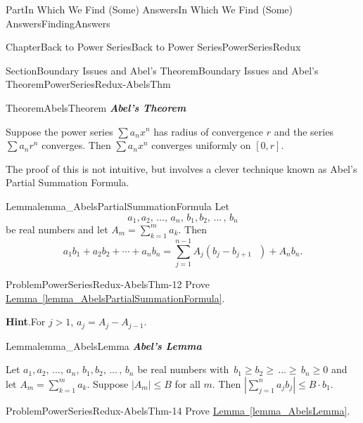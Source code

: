 \documentclass[oneside,10pt,]{book}
\newcommand{\blocktitlefont}{\relax}
\newcommand{\xreffont}{\relax}
\newcommand{\alert}[1]{\textbf{\textit{#1}}}
\numberwithin{equation}{part}
\newcommand{\eps}{\varepsilon}
\newcommand{\gt}{>}
\begin{document}
\begin{partptx}{Part}{In Which We Find (Some) Answers}{}{In Which We Find (Some) Answers}{}{}{FindingAnswers}
\begin{chapterptx}{Chapter}{Back to Power Series}{}{Back to Power Series}{}{}{PowerSeriesRedux}
\begin{sectionptx}{Section}{Boundary Issues and Abel's Theorem}{}{Boundary Issues and Abel's Theorem}{}{}{PowerSeriesRedux-AbelsThm}
\begin{theorem}{Theorem}{}{}{AbelsTheorem}%
\alert{Abel's Theorem}%
\par
{} Suppose the power series \(\sum a_nx^n\) has radius of convergence \(r\) and the series \(\sum a_nr^n\) converges.  Then \(\sum a_nx^n\) converges uniformly on \([0, r]\).%
\end{theorem}
The proof of this is not intuitive, but involves a clever technique known as Abel's Partial Summation Formula.%
\begin{lemma}{Lemma}{}{}{lemma_AbelsPartialSummationFormula}%
Let%
\begin{equation*}
a_1,a_2,\,\ldots,\,a_n,\,b_1,b_2,\,\ldots\,,\,b_n
\end{equation*}
be real numbers and let \(A_m=\sum_{k=1}^ma_k\).  Then%
\begin{equation*}
a_1b_1+a_2b_2+\cdots+a_nb_n=\sum_{j=1}^{n-1}A_j\left(b_j-b_{j+1}\text{ } \right)+A_nb_n\text{.}
\end{equation*}
%
\end{lemma}
\begin{problem}{Problem}{}{PowerSeriesRedux-AbelsThm-12}%
Prove \hyperref[lemma_AbelsPartialSummationFormula]{Lemma~{\xreffont\ref{lemma_AbelsPartialSummationFormula}}}.%
\par\smallskip%
\noindent\textbf{\blocktitlefont Hint}.\hypertarget{PowerSeriesRedux-AbelsThm-12-3}{}\quad{}For \(j>1\), \(a_j=A_j-A_{j-1}\).%
\end{problem}
\begin{lemma}{Lemma}{}{}{lemma_AbelsLemma}%
\alert{Abel's Lemma}%
\par
Let \(a_1,a_2,\,\ldots,\,a_n,\,b_1,b_2,\,\ldots\,,\,b_n\) be real numbers with \(\,b_1\geq
b_2\geq\,\ldots\geq\,b_n\geq 0\) and let \(A_m=\sum_{k=1}^ma_k\).  Suppose \(|A_m|\leq B\) for all \(m\).  Then \(|\sum_{j=1}^na_jb_j|\leq B\cdot
b_1\).%
\end{lemma}
\begin{problem}{Problem}{}{PowerSeriesRedux-AbelsThm-14}%
 Prove \hyperref[lemma_AbelsLemma]{Lemma~{\xreffont\ref{lemma_AbelsLemma}}}.%
\end{problem}
\end{sectionptx}
\end{chapterptx}
\end{partptx}
\end{document}
